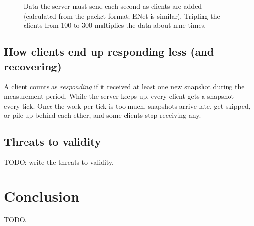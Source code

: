 \documentclass[11pt]{article}
\begin{document}
\begin{figure}[H]
\centering
{}
\caption{Data the server must send each second as clients are added (calculated
from the packet format; ENet is similar). Tripling the clients from 100 to 300
multiplies the data about nine times.}
\label{fig:growth}
\end{figure}

\subsection{How clients end up responding less (and recovering)}\label{sec:chain}
A client counts as \textit{responding} if it received at least one new snapshot during the
measurement period. While the server keeps up, every client gets a snapshot every
tick. Once the work per tick is too much, snapshots arrive late, get skipped, or
pile up behind each other, and some clients stop receiving any.

\subsection{Threats to validity}
TODO: write the threats to validity.

\section{Conclusion}
TODO.
\end{document}
